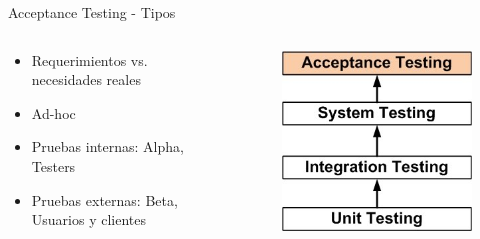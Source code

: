 \documentclass[aspectratio=169]{beamer}
\begin{document}
\begin{frame}{Acceptance Testing - Tipos}
\begin{columns}[T]
	\begin{column}[T]{6cm}
		\begin{itemize}
			\item Requerimientos vs. necesidades reales
			\item Ad-hoc
			\item Pruebas internas: Alpha, Testers
			\item Pruebas externas: Beta, Usuarios y clientes
		\end{itemize}
	\end{column}
	\begin{column}[T]{4cm} %
		\begin{figure}
			\centering
			\includegraphics[width=0.8\linewidth]{Images/acceptancetesting}
		\end{figure}
	\end{column}
\end{columns}
\end{frame}
\end{document}
